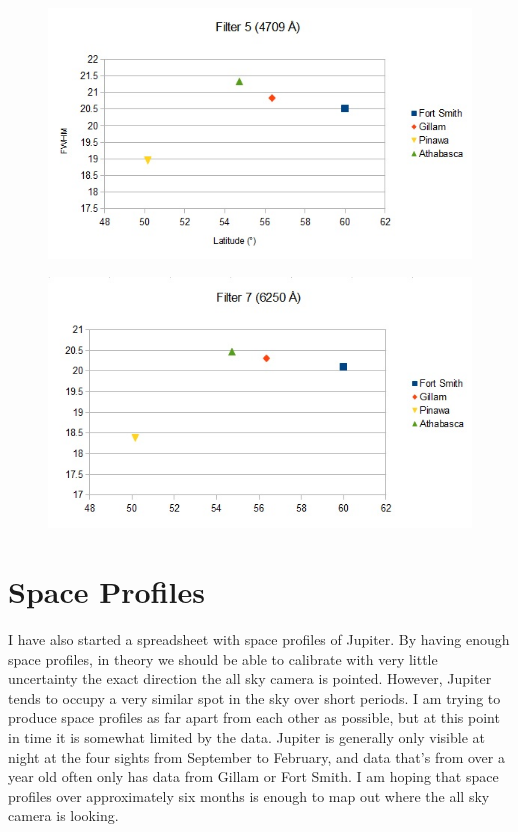 \documentclass[11pt]{article}
\begin{document}
\begin{figure}[h!]
\includegraphics[scale=1.0]{filter5_FWHM.jpg}
\end{figure}

\begin{figure}[h!]
\includegraphics[scale=1.0]{filter7_FWHM.jpg}
\end{figure}


\section{Space Profiles}
\hspace{0.5cm}

I have also started a spreadsheet with space profiles of Jupiter. By having enough space profiles, in theory we should be able to calibrate with very little uncertainty the exact direction the all sky camera is pointed. However, Jupiter tends to occupy a very similar spot in the sky over short periods. I am trying to produce space profiles as far apart from each other as possible, but at this point in time it is somewhat limited by the data. Jupiter is generally only visible at night at the four sights from September to February, and data that's from over a year old often only has data from Gillam or Fort Smith. I am hoping that space profiles over approximately six months is enough to map out where the all sky camera is looking. 
\end{document}
